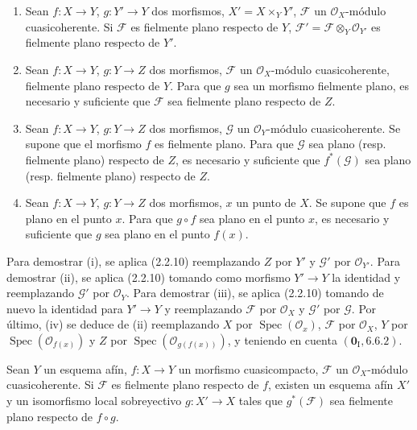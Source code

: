 \begin{corollary}[2.2.11]
\label{IV.2.2.11-fr}
\begin{enumerate}
\item[\textup{(i)}] Sean $f:X\to Y$, $g:Y'\to Y$ dos morfismos,
$X'=X\times_Y Y'$, $\mathscr F$ un $\mathcal O_X$-módulo cuasicoherente. Si
$\mathscr F$ es fielmente plano respecto de $Y$,
$\mathscr F'=\mathscr F\otimes_Y\mathcal O_{Y'}$ es fielmente plano
respecto de $Y'$.
\item[\textup{(ii)}] Sean $f:X\to Y$, $g:Y\to Z$ dos morfismos, $\mathscr F$ un
$\mathcal O_X$-módulo cuasicoherente, fielmente plano respecto de $Y$.
Para que $g$ sea un morfismo fielmente plano, es necesario y suficiente que
$\mathscr F$ sea fielmente plano respecto de $Z$.
\item[\textup{(iii)}] Sean $f:X\to Y$, $g:Y\to Z$ dos morfismos, $\mathscr G$ un
$\mathcal O_Y$-módulo cuasicoherente. Se supone que el morfismo $f$ es
fielmente plano. Para que $\mathscr G$ sea plano \textup{(resp.} fielmente plano)
respecto de $Z$, es necesario y suficiente que $f^*(\mathscr G)$ sea plano
\textup{(resp.} fielmente plano) respecto de $Z$.
\item[\textup{(iv)}] Sean $f:X\to Y$, $g:Y\to Z$ dos morfismos, $x$ un punto de
$X$. Se supone que $f$ es plano en el punto $x$. Para que $g\circ f$ sea
plano en el punto $x$, es necesario y suficiente que $g$ sea plano en el
punto $f(x)$.
\end{enumerate}
\end{corollary}

Para demostrar (i), se aplica (2.2.10) reemplazando $Z$ por $Y'$ y
$\mathscr G'$ por $\mathcal O_{Y'}$. Para demostrar (ii), se aplica
(2.2.10) tomando como morfismo $Y'\to Y$ la identidad y reemplazando
$\mathscr G'$ por $\mathcal O_Y$. Para demostrar (iii), se aplica (2.2.10)
tomando de nuevo la identidad para $Y'\to Y$ y reemplazando $\mathscr F$ por
$\mathcal O_X$ y $\mathscr G'$ por $\mathscr G$. Por último, (iv) se deduce
de (ii) reemplazando $X$ por $\operatorname{Spec}(\mathcal O_x)$,
$\mathscr F$ por $\mathcal O_X$, $Y$ por
$\operatorname{Spec}(\mathcal O_{f(x)})$ y $Z$ por
$\operatorname{Spec}(\mathcal O_{g(f(x))})$, y teniendo en cuenta
$(\mathbf{0}_{\mathrm I},6.6.2)$.

\begin{corollary}[2.2.12]
\label{IV.2.2.12-fr}
Sean $Y$ un esquema afín, $f:X\to Y$ un morfismo cuasicompacto,
$\mathscr F$ un $\mathcal O_X$-módulo cuasicoherente. Si $\mathscr F$ es
fielmente plano respecto de $f$, existen un esquema afín $X'$ y un
isomorfismo local sobreyectivo $g:X'\to X$ tales que $g^*(\mathscr F)$ sea
fielmente plano respecto de $f\circ g$.
\end{corollary}

